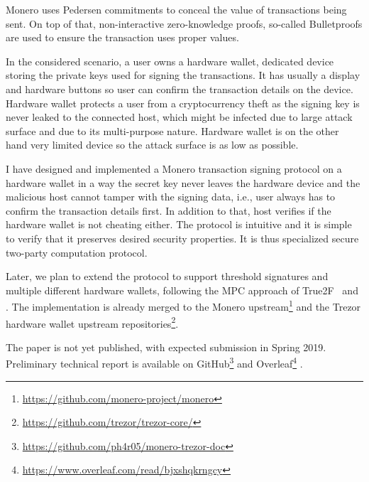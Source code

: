 \documentclass[
  digital, %
  twoside, %
  table,   %
  lof,     %
  lot,     %
]{fithesis3}
\newcounter{ph4_show_guides}
\theoremstyle{definition}
\theoremstyle{remark}
\begin{document}
Monero uses Pedersen commitments to conceal the value of transactions being sent. On top of that, non-interactive zero-knowledge proofs, so-called Bulletproofs \cite{Bnz2017BulletproofsSP2} are used to ensure the transaction uses proper values.

In the considered scenario, a user owns a hardware wallet, dedicated device storing the private keys used for signing the transactions. It has usually a display and hardware buttons so user can confirm the transaction details on the device. Hardware wallet protects a user from a cryptocurrency theft as the signing key is never leaked to the connected host, which might be infected due to large attack surface and due to its multi-purpose nature. Hardware wallet is on the other hand very limited device so the attack surface is as low as possible. 

I have designed and implemented a Monero transaction signing protocol on a hardware wallet in a way the secret key never leaves the hardware device and the malicious host cannot tamper with the signing data, i.e., user always has to confirm the transaction details first. In addition to that, host verifies if the hardware wallet is not cheating either. The protocol is intuitive and it is simple to verify that it preserves desired security properties. It is thus specialized secure two-party computation protocol. 

Later, we plan to extend the protocol to support threshold signatures and multiple different hardware wallets, following the MPC approach of True2F~\cite{DCMBR18} and 
\cite{2017-ccs-mavroudis}. The implementation is already merged to the Monero upstream\footnote{\url{https://github.com/monero-project/monero}} and the Trezor hardware wallet upstream repositories\footnote{\url{https://github.com/trezor/trezor-core/}}.

The paper is not yet published, with expected submission in Spring 2019. 
Preliminary technical report is available on GitHub\footnote{\url{https://github.com/ph4r05/monero-trezor-doc}} and Overleaf\footnote{\url{https://www.overleaf.com/read/bjxshqkrngcy}} \cite{trezor_monero_tech}.
\end{document}
